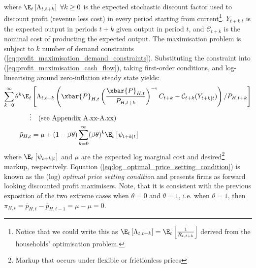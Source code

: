 where $\E_t \left[\Lambda_{t,t+k}\right]\ \forall k \geq 0$ is the expected stochastic discount factor used to discount profit (revenue less cost) in every period starting from current\footnote{Notice that we could write this as $\E_t \left[\Lambda_{t,t+k}\right]=\E_t \left[\frac{1}{R_{t, t+k}}\right]$ derived from the households' optimisation problem.}. $Y_{t+k|t}$ is the expected output in periods $t+k$ given output in period $t$, and $\mathcal{C}_{t+k}$ is the nominal cost of producting the expected output. The maximisation problem is subject to $k$ number of demand constraints (\ref{eq:profit_maximisation_demand_constraints}). Substituting the constraint into (\ref{eq:profit_maximisation_cash_flow}), taking first-order conditions, and log-linearising around zero-inflation steady state yields:
\begin{align}
    \sum_{k=0}^{\infty} \theta^k \E_t &\left[\Lambda_{t,t+k} \left( \xbar{P}_{H,t} \left(\frac{\xbar{P}_{H,t}}{P_{H,t+k}}\right)^{-\epsilon} C_{t+k} - \mathcal{C}_{t+k}(Y_{t+k|t})\right) / P_{H,t+k} \right] \\
    \vdots & \quad \text{(see Appendix A.xx-A.xx)} \nonumber \\
    \bar{p}_{H,t} &= \mu + (1-\beta \theta) \sum_{k=0}^{\infty} (\beta \theta)^{k} \E_t \left[ \psi_{t+k|t} \right] \label{eq:log_optimal_price_setting_condition}
\end{align}
where $\E_t \left[ \psi_{t+k|t} \right]$ and $\mu$ are the expected log marginal cost and desired\footnote{Markup that occurs under flexible or frictionless prices} markup, respectively. Equation (\ref{eq:log_optimal_price_setting_condition}) is known as the (log) \textit{optimal price setting condition} and presents firms as forward looking discounted profit maximisers. Note, that it is consistent with the previous exposition of the two extreme cases when $\theta = 0$ and $\theta = 1$, i.e. when $\theta = 1$, then $\pi_{H,t} = \bar{p}_{H,t} - \bar{p}_{H,t-1} = \mu - \mu = 0$.
